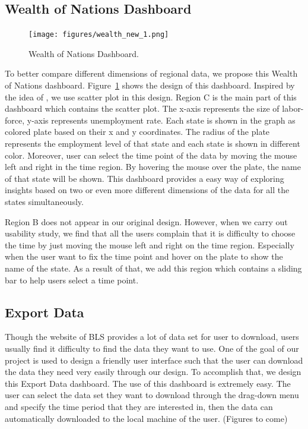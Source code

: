 \documentclass{sigchi}
\begin{document}
\subsection{Wealth of Nations Dashboard}
\begin{figure}
\centering
\texttt{[image: figures/wealth\_new\_1.png]}
\caption{Wealth of Nations Dashboard.}
\label{fig:wealth}
\end{figure}

To better compare different dimensions of regional data, we propose this Wealth of Nations dashboard. Figure~\ref{fig:wealth} shows the design of this dashboard. Inspired by the idea of \cite{wealth}, we use scatter plot in this design.
Region C is the main part of this dashboard which contains the scatter plot. The x-axis represents the size of labor-force, y-axis represents unemployment rate. Each state is shown in the graph as colored plate based on their x and y coordinates. The radius of the plate represents the employment level of that state and each state is shown in different color. Moreover, user can select the time point of the data by moving the mouse left and right in the time region. By hovering the mouse over the plate, the name of that state will be shown. This dashboard provides a easy way of exploring insights based on two or even more different dimensions of the data for all the states simultaneously.

Region B does not appear in our original design. However, when we carry out usability study, we find that all the users complain that it is difficulty to choose the time by just moving the mouse left and right on the time region. Especially when the user want to fix the time point and hover on the plate to show the name of the state. As a result of that, we add this region which contains a sliding bar to help users select a time point.


\subsection{Export Data}
Though the website of BLS \cite{Labor_data} provides a lot of data set for user to download, users usually find it difficulty to find the data they want to use. One of the goal of our project is used to design a friendly user interface such that the user can download the data they need very easily through our design. To accomplish that, we design this Export Data dashboard. The use of this dashboard is extremely easy. The user can select the data set they want to download through the drag-down menu and specify the time period that they are interested in, then the data can automatically downloaded to the local machine of the user. (Figures to come)
\end{document}
